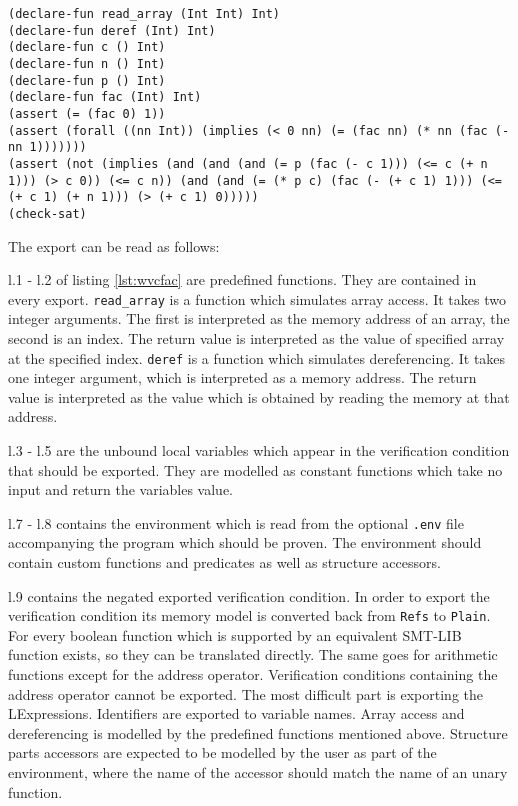 \documentclass[12pt]{article}
\begin{document}
\begin{minipage}{\linewidth}
\begin{lstlisting}[style=c0, caption=an exported verification condition, label=lst:wvcfac]
(declare-fun read_array (Int Int) Int)
(declare-fun deref (Int) Int)
(declare-fun c () Int)
(declare-fun n () Int)
(declare-fun p () Int)
(declare-fun fac (Int) Int)
(assert (= (fac 0) 1))
(assert (forall ((nn Int)) (implies (< 0 nn) (= (fac nn) (* nn (fac (- nn 1)))))))
(assert (not (implies (and (and (and (= p (fac (- c 1))) (<= c (+ n 1))) (> c 0)) (<= c n)) (and (and (= (* p c) (fac (- (+ c 1) 1))) (<= (+ c 1) (+ n 1))) (> (+ c 1) 0)))))
(check-sat)
\end{lstlisting}
\end{minipage}

The export can be read as follows:

l.1 - l.2 of listing \ref{lst:wvcfac} are predefined functions. They are contained in every export.
\texttt{read\_array} is a function which simulates array access. It takes two integer arguments.
The first is interpreted as the memory address of an array, the second is an index.
The return value is interpreted as the value of specified array at the specified index.
\texttt{deref} is a function which simulates dereferencing.
It takes one integer argument, which is interpreted as a memory address.
The return value is interpreted as the value which is obtained by reading the memory at that address.

l.3 - l.5 are the unbound local variables which appear in the verification condition that should be exported.
They are modelled as constant functions which take no input and return the variables value.

l.7 - l.8 contains the environment which is read from the optional \texttt{.env} file accompanying the program which should be proven.
The environment should contain custom functions and predicates as well as structure accessors.

l.9 contains the negated exported verification condition.
In order to export the verification condition its memory model is converted back from \texttt{Refs} to \texttt{Plain}.
For every boolean function which is supported by \verifyc an equivalent SMT-LIB function exists, so they can be translated directly.
The same goes for arithmetic functions except for the address operator.
Verification conditions containing the address operator cannot be exported.
The most difficult part is exporting the LExpressions.
Identifiers are exported to variable names.
Array access and dereferencing is modelled by the predefined functions mentioned above.
Structure parts accessors are expected to be modelled by the user as part of the environment,
where the name of the accessor should match the name of an unary function.
\end{document}

